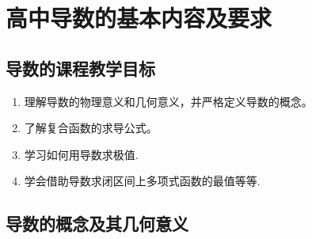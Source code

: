 \chapter{高中导数的基本内容及要求}


\section{导数的课程教学目标}

\begin{enumerate}[(1)]
  \item 理解导数的物理意义和几何意义，并严格定义导数的概念。
  \item 了解复合函数的求导公式。
  \item 学习如何用导数求极值.
  \item 学会借助导数求闭区间上多项式函数的最值等等\cite{普通高中数学课程标准}.
\end{enumerate}


\section{导数的概念及其几何意义}








